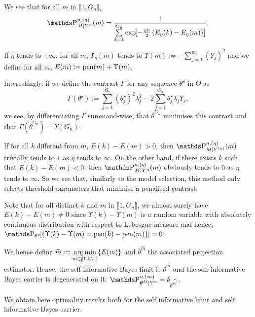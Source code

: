 We see that for all $m$ in $\llbracket 1, G_{n} \rrbracket$,
\[\P_{M\vert Y^{n}}^{n, (\eta)}(m) = \frac{1}{\sum\limits_{k = 1}^{G_{n}}\exp\!\!\left[- \frac{\eta n}{2}\left(E_{\eta}(k) - E_{\eta}(m)\right)\right]}.\]

If $\eta$ tends to $+\infty$, for all $m$, $\Upsilon_{\eta}(m)$ tends to $\Upsilon(m) := -\sum\limits_{j = 1}^{m} \left(Y_{j}\right)^{2}$ and we define for all $m$, $E(m) := \operatorname{pen}(m) + \Upsilon(m)$.

\medskip

Interestingly, if we define the contrast $\Gamma$ for any sequence $\theta^{\star}$ in $\Theta$ as
\[\Gamma\left(\theta^{\star}\right) := \sum\limits_{j = 1}^{G_{n}} \left(\theta^{\star}_{j}\right)^{2}\lambda_{j}^{2} - 2 \sum\limits_{j = 1}^{G_{n}} \theta^{\star}_{j}\lambda_{j} Y_{j},\]
we see, by differentiating $\Gamma$ summand-wise, that $\overline{\theta}^{G_{n}}$ minimises this contrast and that $\Gamma\left(\overline{\theta}^{G_{n}}\right) = \Upsilon\left(G_{n}\right)$.

\medskip

If for all $k$ different from $m$, $E(k) - E(m) > 0$, then $\P_{M\vert Y^{(n)}}^{n,(\eta)}(m)$ trivially tends to $1$ as $\eta$ tends to $\infty$. On the other hand, if there exists $k$ such that $E(k) - E(m) < 0$,  then $\P_{M\vert Y^{n}}^{n, (\eta)}(m)$ obviously tends to $0$ as $\eta$ tends to $\infty$. So we see that, similarly to the model selection, this method only selects threshold parameters that minimise a penalised contrast.

\medskip

Note that for all distinct $k$ and $m$ in $\llbracket 1, G_{n} \rrbracket$, we almost surely have $E(k) - E(m) \neq 0$ since $\Upsilon(k) - \Upsilon(m)$ is a random variable with absolutely continuous distribution with respect to Lebesgue measure and hence, $\P_{\theta^{\circ}}\!\!\left[\{\Upsilon(k) - \Upsilon(m) = \pen(k) - \pen(m)\}\right] = 0$.

We hence define $\widehat{m} := \operatorname*{arg\,min}\limits_{m \in \llbracket 1, G_{n} \rrbracket}\{E(m)\}$ and $\overline{\theta}^{\widehat{m}}$ the associated projection estimator. Hence, the self informative Bayes limit is $\overline{\theta}^{\widehat{m}}$ and the self informative Bayes carrier is degenerated on it: $\P_{\boldsymbol{\theta}^{M} \vert Y^{n}}^{n, (\infty)} = \delta_{\overline{\theta}^{\widehat{m}}}$.

\medskip

We obtain here optimality results both for the self informative limit and self informative Bayes carrier.

